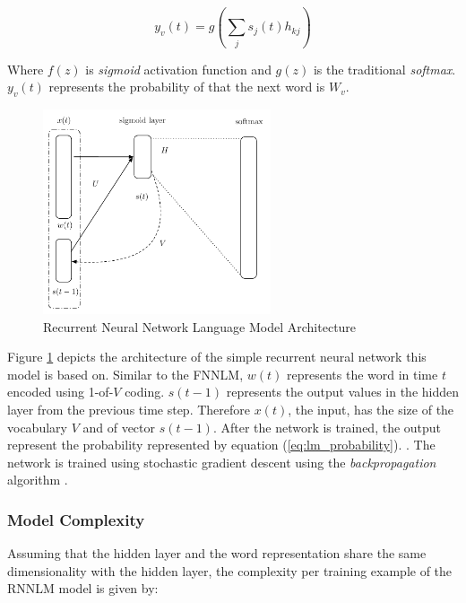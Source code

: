 \begin{equation}  y_v(t) = g \left( \sum_{j}{s_j(t)h_{kj}}
  \right)   \end{equation}


Where   $f(z)$ is \textit{sigmoid} activation function and $g(z)$  is the
traditional   \textit{softmax}.  $y_v(t)$ represents the probability of that
the next word is $W_v$.


\begin{figure}[hptb!]
    \centering
    \includegraphics[width=0.6\textwidth]{images/mikolov-rnnlm.pdf} 
    \caption{Recurrent Neural Network Language Model Architecture}
    \label{fig:RNNLM_architecture}
\end{figure}



Figure \ref{fig:RNNLM_architecture} depicts the architecture of the simple
recurrent neural network this model is based on. Similar to the \ac{FNNLM},    $w(t)$ represents the word in time $t$ encoded using 1-of-$V$ coding.  $s(t-1)$ represents the output values in the
hidden layer from the previous time step. Therefore $x(t)$, the input, has
the size of the vocabulary $V$ and of vector $s(t-1)$. After the network is
trained, the output represent the probability represented by equation
(\ref{eq:lm_probability}).  \cite{mikolovphd2012}. The network is trained
using stochastic gradient descent using the
\textit{backpropagation} algorithm \cite{conf/interspeech/MikolovKBCK10,Bishop:1995:NNP:525960}.


\subsubsection{Model Complexity}
\label{sec:sub:sub:mikolov_rnnlm_complexity}

Assuming that the hidden layer and the word representation share the same
dimensionality with the hidden layer, the complexity per training example of the \ac{RNNLM} model is
given by:


